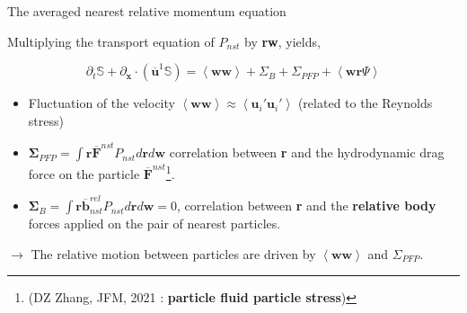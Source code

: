\documentclass{sintefbeamer}
\newcommand{\avg}[1]{\left<#1\right>}
\newcommand{\nstavg}[1]{\overline{#1}^{nst}}
\newcommand{\condavg}[2]{\overline{#1}^{#2}}
\newcommand{\nstrelavg}[1]{\overline{#1}_{nst}^{rel}}
\newcommand{\pddt}{\partial_t}
\begin{document}
\begin{frame}{The averaged nearest relative momentum equation}
  
  Multiplying the transport equation of $P_{nst}$ by \textbf{rw}, yields, 
  
  \begin{equation*}
    \pddt \mathbb{S} 
  + \partial_{\textbf{x}} \cdot (
    \condavg{\textbf{u}}{1} 
    \mathbb{S})
  = \avg{\textbf{w}\textbf{w}}
  + \Sigma_{B}
  + \Sigma_{PFP}
  + \avg{\textbf{w}\textbf{r}\Psi}
\end{equation*}
  
  \begin{itemize}
      \item Fluctuation of the velocity $\avg{\textbf{w}\textbf{w}} \approx \avg{\textbf{u}_i'\textbf{u}_i'}$ (related to the Reynolds stress)
    \item $\mathbf{\Sigma}_{PFP} = \int \textbf{r} \nstavg{\textbf{F}} P_{nst} d\textbf{r}d\textbf{w}$ correlation between \textbf{r} and the hydrodynamic  drag force on the particle $\nstavg{\textbf{F}}$\footnote{(DZ Zhang, JFM, 2021 : \textbf{particle fluid particle stress})}. 
    \item $\mathbf{\Sigma}_{B} = \int \textbf{r} \nstrelavg{\textbf{b}} P_{nst} d\textbf{r}d\textbf{w} = 0$, correlation between \textbf{r} and the \textbf{relative body} forces applied on the pair of nearest particles.
  \end{itemize}
  
  $\rightarrow$  The relative motion between particles are driven by $\avg{\textbf{w}\textbf{w}}$ and $\Sigma_{PFP}$.
  
  \end{frame}
  
\end{document}

